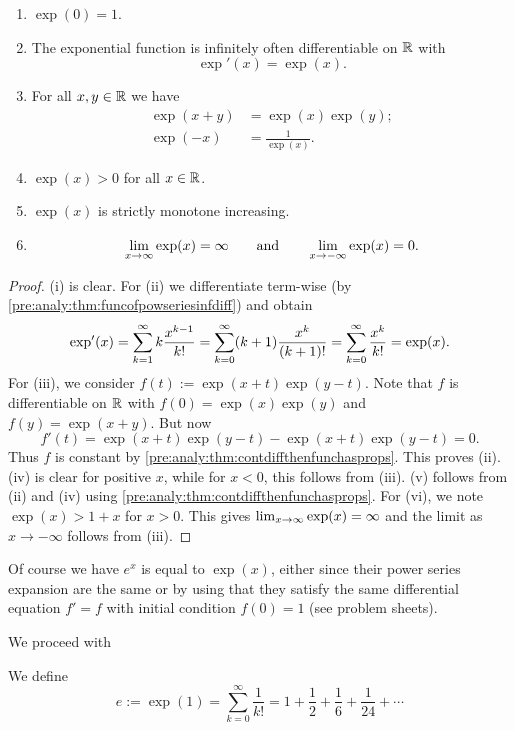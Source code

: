 \documentclass[10pt, a4paper]{article}
\newcommand{\infsumo}[1][k = 0]{\sum_{#1}^{\infty}}
\begin{document}
\begin{theorem}
    \begin{enumerate}[label = (\roman*)]
        \item $\exp(0) = 1$.
        \item The exponential function is infinitely often differentiable on $\R$ with
        \[
        \exp'(x) = \exp(x).
        \]
        \item For all $x, y \in \R$ we have
        \begin{align*}
            \exp(x + y) &= \exp(x)\exp(y); \\
            \exp(-x) &= \frac{1}{\exp(x)}.
        \end{align*}
        \item $\exp(x) > 0$ for all $x \in \R$.
        \item $\exp(x)$ is strictly monotone increasing.
        \item
        \[
        \liminfty[x]\exp(x) = \infty\qquad\text{and}\qquad\lim_{x \rightarrow -\infty}\exp(x) = 0.
        \]
    \end{enumerate}
    \begin{proof}
        (i) is clear.
        For (ii) we differentiate term-wise
        (by \autoref{pre:analy:thm:funcofpowseriesinfdiff})
        and obtain
        \[
        \exp'(x) = \infsum k\frac{x ^ {k - 1}}{k!} = \infsumo(k + 1)\frac{x ^ k}{(k + 1)!} = \infsumo\frac{x ^ k}{k!} = \exp(x).
        \]
        For (iii),
        we consider $f(t) := \exp(x + t)\exp(y - t)$.
        Note that $f$ is differentiable on $\R$ with $f(0) = \exp(x)\exp(y)$ and $f(y) = \exp(x + y)$.
        But now
        \[
        f'(t) = \exp(x + t)\exp(y - t) - \exp(x + t)\exp(y - t) = 0.
        \]
        Thus $f$ is constant by \autoref{pre:analy:thm:contdiffthenfunchasprops}.
        This proves (ii).
        (iv) is clear for positive $x$,
        while for $x < 0$,
        this follows from (iii).
        (v) follows from (ii) and (iv) using \autoref{pre:analy:thm:contdiffthenfunchasprops}.
        For (vi),
        we note $\exp(x) > 1 + x$ for $x > 0$.
        This gives $\liminfty[x]\exp(x) = \infty$ and the limit as $x \rightarrow -\infty$ follows from (iii).
    \end{proof}
\end{theorem}

\begin{remark}
    Of course we have $e ^ x$ is equal to $\exp(x)$,
    either since their power series expansion are the same or by using that they satisfy the same differential equation $f' = f$ with initial condition $f(0) = 1$
    (see problem sheets).
\end{remark}
We proceed with
\begin{definition}
    We define
    \[
    e := \exp(1) = \infsumo\frac{1}{k!} = 1 + \frac{1}{2} + \frac{1}{6} + \frac{1}{24} + \dotsi
    \]
\end{definition}
\end{document}
